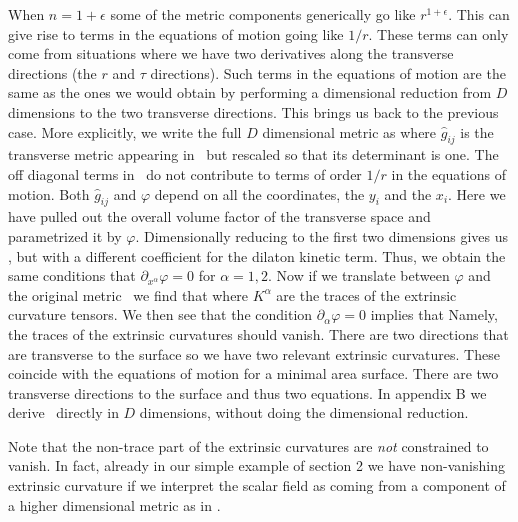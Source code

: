 When  $n=1+ \epsilon$   some of the metric components  generically  go like
$r^{ 1 + \epsilon}$. This  can give rise to terms in the equations of motion going like $1/r$. These terms can only
come from situations where we have two derivatives along the transverse directions (the $r$ and $\tau$ directions).
Such terms in the equations of motion are the same as the ones we would obtain by performing a dimensional reduction
from $D$ dimensions to the two transverse directions. This  brings us back to the previous case.
More explicitly, we write the full $D$ dimensional metric as
\eqn{}
where $\hat g_{ij}$ is the transverse metric appearing in \expme\ but rescaled so that  its determinant is one.
The off diagonal terms in \expme\ do not contribute to terms of order $1/r$ in the equations of motion.
Both $\hat g_{ij}$ and $\varphi$ depend on all the coordinates, the $y_i$ and the $x_i$.
Here we have pulled out the overall volume factor of the transverse space and parametrized it by $\varphi$.
Dimensionally reducing to the first two dimensions gives us \twoddg, but with a different coefficient for the dilaton
kinetic term.
Thus, we obtain the same conditions that $\partial_{x^\alpha} \varphi =0$ for $\alpha =1,2$.
Now if we translate between $\varphi$ and the original metric \expme\ we find that
\eqn{}
 where $K^\alpha$ are the traces of the extrinsic curvature tensors.
 We then see that the condition $\partial_\alpha \varphi =0$ implies that
 \eqn{}
 Namely, the traces of the extrinsic curvatures should vanish. There are two directions that are transverse to the surface
 so we have two relevant extrinsic curvatures. These coincide with the equations of motion for a minimal area surface.
 There are two transverse directions to the surface and thus two equations.
 In appendix B we derive \msec\ directly in $D$ dimensions, without doing the dimensional reduction.

 Note that the non-trace part of the extrinsic curvatures are {\it not } constrained to vanish.
 In fact, already in our simple example of section 2 we have non-vanishing extrinsic curvature if we interpret
 the scalar field as coming from a component of a higher dimensional metric as in \metrcto .


